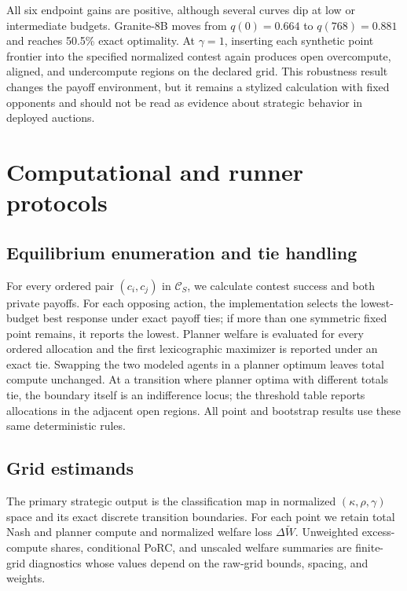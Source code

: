 \documentclass{article}
\begin{document}
All six endpoint gains are positive, although several curves dip at low or intermediate budgets. Granite-8B moves from $q(0)=0.664$ to $q(768)=0.881$ and reaches 50.5\% exact optimality. At $\gamma=1$, inserting each synthetic point frontier into the specified normalized contest again produces open overcompute, aligned, and undercompute regions on the declared grid. This robustness result changes the payoff environment, but it remains a stylized calculation with fixed opponents and should not be read as evidence about strategic behavior in deployed auctions.

\section{Computational and runner protocols}
\label{app:computationalprotocol}

\subsection{Equilibrium enumeration and tie handling}
For every ordered pair $(c_i,c_j)$ in $\mathcal C_S$, we calculate contest success and both private payoffs. For each opposing action, the implementation selects the lowest-budget best response under exact payoff ties; if more than one symmetric fixed point remains, it reports the lowest. Planner welfare is evaluated for every ordered allocation and the first lexicographic maximizer is reported under an exact tie. Swapping the two modeled agents in a planner optimum leaves total compute unchanged. At a transition where planner optima with different totals tie, the boundary itself is an indifference locus; the threshold table reports allocations in the adjacent open regions. All point and bootstrap results use these same deterministic rules.

\subsection{Grid estimands}
The primary strategic output is the classification map in normalized $(\kappa,\rho,\gamma)$ space and its exact discrete transition boundaries. For each point we retain total Nash and planner compute and normalized welfare loss $\Delta\widetilde W$. Unweighted excess-compute shares, conditional PoRC, and unscaled welfare summaries are finite-grid diagnostics whose values depend on the raw-grid bounds, spacing, and weights.
\end{document}
